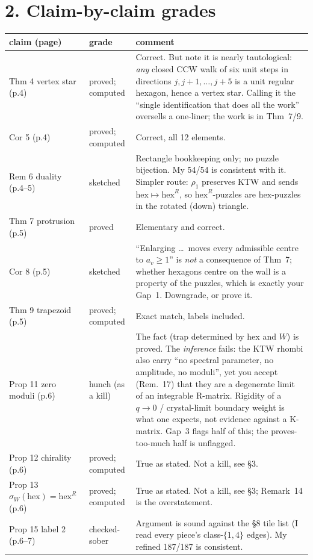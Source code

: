 \documentclass[11pt]{article}
\newcommand{\hexR}{\mathrm{hex}^{R}}
\newcommand{\hex}{\mathrm{hex}}
\begin{document}
\section*{2. Claim-by-claim grades}
{\small\begin{tabular}{@{}p{3.6cm}p{2.3cm}p{9.6cm}@{}}\toprule
claim (page) & grade & comment\\\midrule
Thm 4 vertex star (p.4) & proved; computed & Correct. But note it is nearly tautological: \emph{any} closed CCW walk of six unit steps in directions $j,j{+}1,\dots,j{+}5$ is a unit regular hexagon, hence a vertex star. Calling it the ``single identification that does all the work'' oversells a one-liner; the work is in Thm~7/9.\\
Cor 5 (p.4) & proved; computed & Correct, all 12 elements.\\
Rem 6 duality (p.4--5) & sketched & Rectangle bookkeeping only; no puzzle bijection. My 54/54 is consistent with it. Simpler route: $\rho_1$ preserves KTW and sends $\hex\mapsto\hexR$, so $\hexR$-puzzles are $\hex$-puzzles in the rotated (down) triangle.\\
Thm 7 protrusion (p.5) & proved & Elementary and correct.\\
Cor 8 (p.5) & sketched & ``Enlarging \dots\ moves every admissible centre to $a_v\ge1$'' is \emph{not} a consequence of Thm~7; whether hexagons centre on the wall is a property of the puzzles, which is exactly your Gap~1. Downgrade, or prove it.\\
Thm 9 trapezoid (p.5) & proved; computed & Exact match, labels included.\\
Prop 11 zero moduli (p.6) & hunch (as a kill) & The fact (trap determined by hex and $W$) is proved. The \emph{inference} fails: the KTW rhombi also carry ``no spectral parameter, no amplitude, no moduli'', yet you accept (Rem.~17) that they are a degenerate limit of an integrable R-matrix. Rigidity of a $q\!\to\!0$ / crystal-limit boundary weight is what one expects, not evidence against a K-matrix. Gap~3 flags half of this; the proves-too-much half is unflagged.\\
Prop 12 chirality (p.6) & proved; computed & True as stated. Not a kill, see \S3.\\
Prop 13 $\sigma_W(\hex)=\hexR$ (p.6) & proved; computed & True as stated. Not a kill, see \S3; Remark~14 is the overstatement.\\
Prop 15 label 2 (p.6--7) & checked-sober & Argument is sound against the \S8 tile list (I read every piece's class-$\{1,4\}$ edges). My refined 187/187 is consistent.\\

\end{tabular}}
\end{document}
